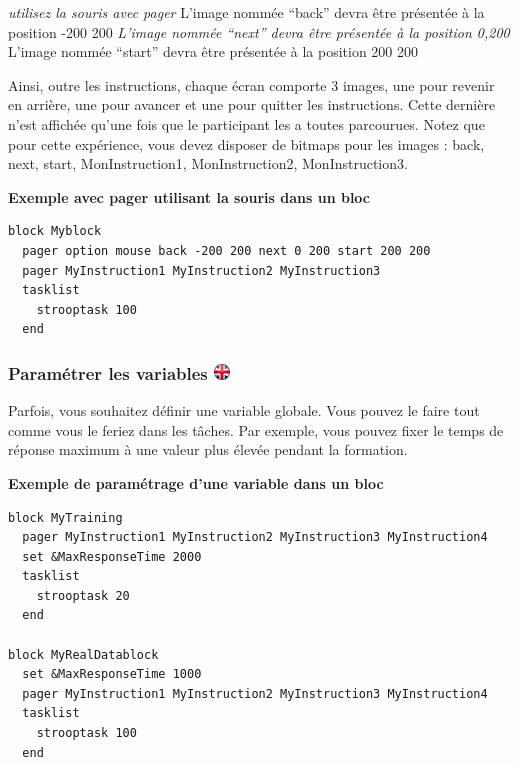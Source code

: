 \documentclass[
]{book}
\begin{document}
\emph{utilisez la souris avec pager
}L'image nommée ``back'' devra être présentée à la position -200 200
\emph{L'image nommée ``next'' devra être présentée à la position 0,200
}L'image nommée ``start'' devra être présentée à la position 200 200

Ainsi, outre les instructions, chaque écran comporte 3 images, une pour revenir en arrière, une pour avancer et une pour quitter les instructions. Cette dernière n'est affichée qu'une fois que le participant les a toutes parcourues. Notez que pour cette expérience, vous devez disposer de bitmaps pour les images : back, next, start, MonInstruction1, MonInstruction2, MonInstruction3.

\textbf{Exemple avec pager utilisant la souris dans un bloc}

\begin{verbatim}
block Myblock
  pager option mouse back -200 200 next 0 200 start 200 200
  pager MyInstruction1 MyInstruction2 MyInstruction3
  tasklist
    strooptask 100
  end
\end{verbatim}

\hypertarget{paramuxe9trer-les-variables}{%
\subsubsection[Paramétrer les variables ]{\texorpdfstring{Paramétrer les variables \href{https://www.psytoolkit.org/doc3.2.0/syntax.html\#block-set}{\protect\includegraphics{img/ukflag.png}}}{Paramétrer les variables }}\label{paramuxe9trer-les-variables}}

Parfois, vous souhaitez définir une variable globale. Vous pouvez le faire tout comme vous le feriez dans les tâches. Par exemple, vous pouvez fixer le temps de réponse maximum à une valeur plus élevée pendant la formation.

\textbf{Exemple de paramétrage d'une variable dans un bloc}

\begin{verbatim}
block MyTraining
  pager MyInstruction1 MyInstruction2 MyInstruction3 MyInstruction4
  set &MaxResponseTime 2000
  tasklist
    strooptask 20
  end

block MyRealDatablock
  set &MaxResponseTime 1000
  pager MyInstruction1 MyInstruction2 MyInstruction3 MyInstruction4
  tasklist
    strooptask 100
  end
\end{verbatim}
\end{document}

